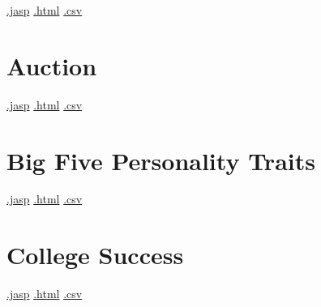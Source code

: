 \documentclass[
  letterpaper,
  DIV=11,
  numbers=noendperiod]{scrreprt}
\begin{document}
\textbar{}
\href{https://github.com/jasp-stats/jasp-data-library/raw/main/Album\%20Sales/Album\%20Sales.jasp}{.jasp}
\textbar{}
\href{https://htmlpreview.github.io/?https://github.com/jasp-stats/jasp-data-library/blob/main/Album\%20Sales/index.html}{.html}
\textbar{}
\href{https://raw.githubusercontent.com/jasp-stats/jasp-data-library/main/Album\%20Sales/Album\%20Sales.csv}{.csv}

\hypertarget{auction}{%
\section{Auction}\label{auction}}

\textbar{}
\href{https://github.com/jasp-stats/jasp-data-library/raw/main/Auction/Auction.jasp}{.jasp}
\textbar{}
\href{https://htmlpreview.github.io/?https://github.com/jasp-stats/jasp-data-library/blob/main/Auction/index.html}{.html}
\textbar{}
\href{https://raw.githubusercontent.com/jasp-stats/jasp-data-library/main/Auction/Auction.csv}{.csv}

\hypertarget{big-five-personality-traits}{%
\section{Big Five Personality
Traits}\label{big-five-personality-traits}}

\textbar{}
\href{https://github.com/jasp-stats/jasp-data-library/raw/main/Big\%20Five\%20Personality\%20Traits/Big\%20Five\%20Personality\%20Traits.jasp}{.jasp}
\textbar{}
\href{https://htmlpreview.github.io/?https://github.com/jasp-stats/jasp-data-library/blob/main/Big\%20Five\%20Personality\%20Traits/index.html}{.html}
\textbar{}
\href{https://raw.githubusercontent.com/jasp-stats/jasp-data-library/main/Big\%20Five\%20Personality\%20Traits/Big\%20Five\%20Personality\%20Traits.csv}{.csv}

\hypertarget{college-success}{%
\section{College Success}\label{college-success}}

\textbar{}
\href{https://github.com/jasp-stats/jasp-data-library/raw/main/College\%20Success/College\%20Success.jasp}{.jasp}
\textbar{}
\href{https://htmlpreview.github.io/?https://github.com/jasp-stats/jasp-data-library/blob/main/College\%20Success/index.html}{.html}
\textbar{}
\href{https://raw.githubusercontent.com/jasp-stats/jasp-data-library/main/College\%20Success/College\%20Success.csv}{.csv}
\end{document}
